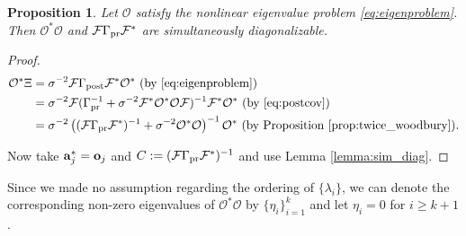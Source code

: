 \documentclass[ba]{imsart}
\newcommand{\obs}{\mathcal{O}}
\newcommand{\fwd}{\mathcal{F}}
\newcommand{\meas}{\mathbf{o}}
\theoremstyle{plain}
\newtheorem{proposition}[theorem]{Proposition}
\theoremstyle{definition}
\theoremstyle{remark}
\providecommand{\DIFaddbegin}{} %
\providecommand{\DIFaddend}{} %
\providecommand{\DIFdelbegin}{} %
\providecommand{\DIFdelend}{} %
\newcommand{\DIFscaledelfig}{0.5}
\newlength{\DIFdelgraphicswidth} %
\newlength{\DIFdelgraphicsheight} %
\newcommand{\DIFaddincludegraphics}[2][]{{\color{blue}\fbox{\DIFOincludegraphics[#1]{#2}}}} %
\newcommand{\DIFdelincludegraphics}[2][]{%
\sbox{\DIFdelgraphicsbox}{\DIFOincludegraphics[#1]{#2}}%
\settoboxwidth{\DIFdelgraphicswidth}{\DIFdelgraphicsbox} %
\settoboxtotalheight{\DIFdelgraphicsheight}{\DIFdelgraphicsbox} %
\scalebox{\DIFscaledelfig}{%
\parbox[b]{\DIFdelgraphicswidth}{\usebox{\DIFdelgraphicsbox}\\[-\baselineskip] \rule{\DIFdelgraphicswidth}{0em}}\llap{\resizebox{\DIFdelgraphicswidth}{\DIFdelgraphicsheight}{%
\setlength{\unitlength}{\DIFdelgraphicswidth}%
\begin{picture}(1,1)%
\thicklines\linethickness{2pt} %
{\color[rgb]{1,0,0}\put(0,0){\framebox(1,1){}}}%
{\color[rgb]{1,0,0}\put(0,0){\line( 1,1){1}}}%
{\color[rgb]{1,0,0}\put(0,1){\line(1,-1){1}}}%
\end{picture}%
}\hspace*{3pt}}} %
} %
\DeclareRobustCommand{\DIFaddbegin}{\DIFOaddbegin \let\includegraphics\DIFaddincludegraphics} %
\DeclareRobustCommand{\DIFaddend}{\DIFOaddend \let\includegraphics\DIFOincludegraphics} %
\DeclareRobustCommand{\DIFdelbegin}{\DIFOdelbegin \let\includegraphics\DIFdelincludegraphics} %
\DeclareRobustCommand{\DIFdelend}{\DIFOaddend \let\includegraphics\DIFOincludegraphics} %
\begin{document}
\begin{proposition}\label{prop:same_ev}
  Let $\obs$ satisfy the nonlinear eigenvalue problem
  \eqref{eq:eigenproblem}. Then $\obs^*\obs$ and $\fwd \prcov \fwd^*$
  are simultaneously diagonalizable.
\end{proposition}
\begin{proof}
  \DIFdelbegin %
\DIFdelend \DIFaddbegin \begin{align}\label{eq:mod_conditions}
    \begin{split}
      \obs^* \Xi &= \sigma^{-2}\fwd \postcov \fwd^* \obs^*  \text{ (by \eqref{eq:eigenproblem})}\\
&= \sigma^{-2} \fwd( \prcov^{-1} + \sigma^{-2}  \fwd^* \obs^* \obs \fwd )^{-1} \fwd^* \obs^*  \text{ (by \eqref{eq:postcov})} \\
&= \sigma^{-2} \left ( (\fwd\prcov\fwd^*)^{-1} + \sigma^{-2}  \obs^* \obs \right )^{-1} \obs^* \text{ (by Proposition \ref{prop:twice_woodbury})}.
    \end{split}
  \end{align}\DIFaddend 

  Now take $\func_j^{*} = \meas_j$ and $C := (\fwd \prcov
  \fwd^*)^{-1}$ and use Lemma \ref{lemma:sim_diag}.
\end{proof}

Since we made no assumption regarding the ordering of $\{\lambda_i\}$,
we can denote the corresponding non-zero eigenvalues of $\obs^*\obs$
by $\{\eta_i\}_{i=1}^{k}$ and let $\eta_i = 0$ for $i \geq k+1$.
\end{document}

